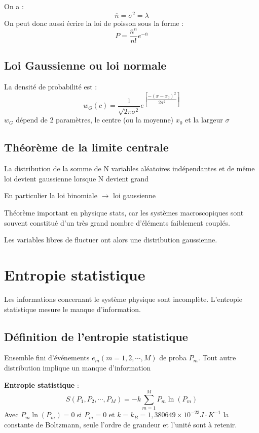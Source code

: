 \documentclass[12pt,a4paper]{report}
\begin{document}
On a :
\[
	\overline{n} = \sigma^2 = \lambda
\]
On peut donc aussi écrire la loi de poisson sous la forme :
\[
	P = \dfrac{\overline{n}^n}{n!}e^{-\overline{n}}
\]

\subsection{Loi Gaussienne ou loi normale}

La densité de probabilité est :
\[
	w_G (c) = \dfrac{1}{\sqrt{2\pi \sigma^2}} e^{\left[ \dfrac{- (x-x_0)^2}{2\sigma^2} \right]}
\]
\(w_G\) dépend de 2 paramètres, le centre (ou la moyenne) \(x_0\) et la largeur \(\sigma\)

\subsection{Théorème de la limite centrale}

La distribution de la somme de N variables aléatoires indépendantes et de même loi devient gaussienne lorsque N devient grand

En particulier la loi binomiale \(\rightarrow\) loi gaussienne

Théorème important en physique stats, car les systèmes macroscopiques sont souvent constitué d'un très grand nombre d'éléments faiblement couplés.

Les variables libres de fluctuer ont alors une distribution gaussienne.

\section{Entropie statistique}

Les informations concernant le système physique sont incomplète.
L'entropie statistique mesure le manque d'information.

\subsection{Définition de l'entropie statistique}

Ensemble fini d'événements \(e_m (m = 1,2, \cdots , M)\) de proba \(P_m\).
Tout autre distribution implique un manque d'information

\textbf{Entropie statistique} :
\[
	S(P_1, P_2, \cdots, P_M) = -k \sum_{m=1}^M P_m \ln(P_m)
\]
Avec \(P_m \ln(P_m) = 0\) si \(P_m = 0\) et \(k = k_B = 1,380649 \times 10^{-23} J\cdot K^{-1}\) la constante de Boltzmann, seule l'ordre de grandeur et l'unité sont à retenir.
\end{document}
